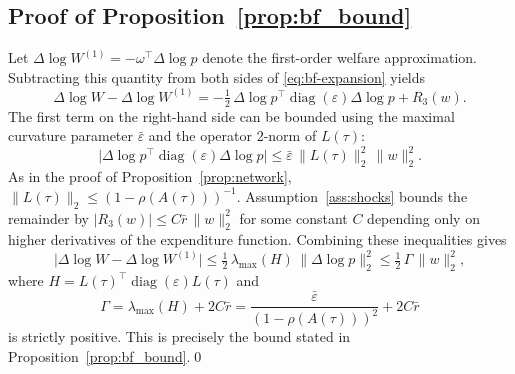 \subsection{Proof of Proposition~\ref{prop:bf_bound}}
Let $\Delta \log W^{(1)} = -\omega^{\top}\Delta\log p$ denote the first-order welfare approximation. Subtracting this quantity from both sides of \eqref{eq:bf-expansion} yields
\begin{equation*}
    \Delta \log W - \Delta \log W^{(1)} = -\tfrac{1}{2}\,\Delta\log p^{\top}\operatorname{diag}(\varepsilon)\Delta\log p + R_3(w).
\end{equation*}
The first term on the right-hand side can be bounded using the maximal curvature parameter $\bar{\varepsilon}$ and the operator $2$-norm of $L(\tau)$:
\begin{equation*}
    \bigl|\Delta\log p^{\top}\operatorname{diag}(\varepsilon)\Delta\log p\bigr| \leq \bar{\varepsilon}\,\|L(\tau)\|_2^2\,\|w\|_2^2.
\end{equation*}
As in the proof of Proposition~\ref{prop:network}, $\|L(\tau)\|_2 \leq (1-\rho(A(\tau)))^{-1}$. Assumption~\ref{ass:shocks} bounds the remainder by $|R_3(w)| \leq C\bar{r}\,\|w\|_2^2$ for some constant $C$ depending only on higher derivatives of the expenditure function. Combining these inequalities gives
\begin{equation*}
    \bigl|\Delta \log W - \Delta \log W^{(1)}\bigr| \leq \tfrac{1}{2}\,\lambda_{\max}(H)\,\|\Delta\log p\|_2^2 \leq \tfrac{1}{2}\,\Gamma\,\|w\|_2^2,
\end{equation*}
where $H = L(\tau)^{\top}\operatorname{diag}(\varepsilon)L(\tau)$ and
\begin{equation*}
    \Gamma = \lambda_{\max}(H) + 2C\bar{r} = \frac{\bar{\varepsilon}}{(1-\rho(A(\tau)))^{2}} + 2C\bar{r}
\end{equation*}
is strictly positive. This is precisely the bound stated in Proposition~\ref{prop:bf_bound}.\qed
